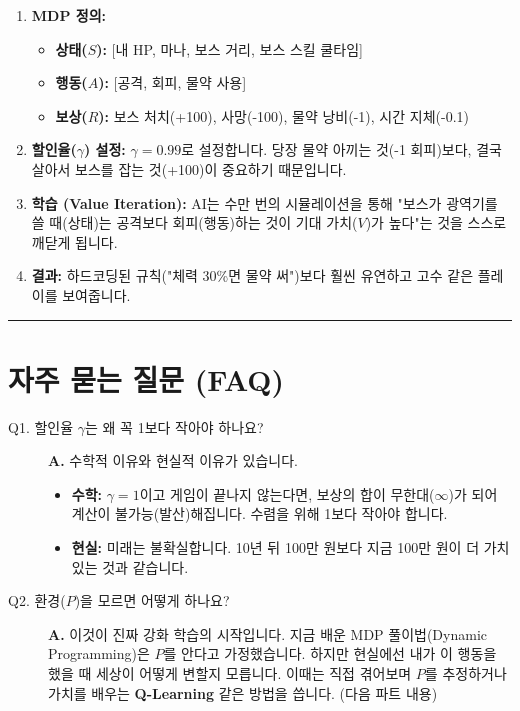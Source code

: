 \documentclass[11pt,a4paper]{book}
\theoremstyle{definition}
\begin{document}
\begin{enumerate}
    \item \textbf{MDP 정의:}
    \begin{itemize}
        \item \textbf{상태($S$):} [내 HP, 마나, 보스 거리, 보스 스킬 쿨타임]
        \item \textbf{행동($A$):} [공격, 회피, 물약 사용]
        \item \textbf{보상($R$):} 보스 처치(+100), 사망(-100), 물약 낭비(-1), 시간 지체(-0.1)
    \end{itemize}
    
    \item \textbf{할인율($\gamma$) 설정:}
    $\gamma=0.99$로 설정합니다. 당장 물약 아끼는 것(-1 회피)보다, 결국 살아서 보스를 잡는 것(+100)이 중요하기 때문입니다.
    
    \item \textbf{학습 (Value Iteration):}
    AI는 수만 번의 시뮬레이션을 통해 "보스가 광역기를 쓸 때(상태)는 공격보다 회피(행동)하는 것이 기대 가치($V$)가 높다"는 것을 스스로 깨닫게 됩니다.
    
    \item \textbf{결과:} 하드코딩된 규칙("체력 30\%면 물약 써")보다 훨씬 유연하고 고수 같은 플레이를 보여줍니다.
\end{enumerate}

\vspace{0.5cm}\hrule\vspace{0.5cm}

\section{자주 묻는 질문 (FAQ)}

\begin{description}
    \item[Q1. 할인율 $\gamma$는 왜 꼭 1보다 작아야 하나요?]
    \textbf{A.} 수학적 이유와 현실적 이유가 있습니다.
    \begin{itemize}
        \item \textbf{수학:} $\gamma=1$이고 게임이 끝나지 않는다면, 보상의 합이 무한대($\infty$)가 되어 계산이 불가능(발산)해집니다. 수렴을 위해 1보다 작아야 합니다.
        \item \textbf{현실:} 미래는 불확실합니다. 10년 뒤 100만 원보다 지금 100만 원이 더 가치 있는 것과 같습니다.
    \end{itemize}
    
    \item[Q2. 환경($P$)을 모르면 어떻게 하나요?]
    \textbf{A.} 이것이 진짜 강화 학습의 시작입니다.
    지금 배운 MDP 풀이법(Dynamic Programming)은 $P$를 안다고 가정했습니다. 하지만 현실에선 내가 이 행동을 했을 때 세상이 어떻게 변할지 모릅니다.
    이때는 직접 겪어보며 $P$를 추정하거나 가치를 배우는 \textbf{Q-Learning} 같은 방법을 씁니다. (다음 파트 내용)
\end{description}
\end{document}
